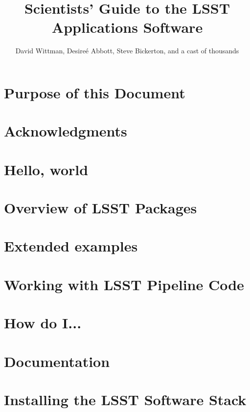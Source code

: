 \documentclass[oneside]{book}
\title{Scientists' Guide to the LSST Applications Software}
\author{David Wittman, Desire\'{e} Abbott, Steve Bickerton, and a cast of thousands}
\begin{document}
\maketitle

\chapter*{Purpose of this Document\label{chap-purpose}}


\chapter*{Acknowledgments\label{chap-acknowledgements}}



\chapter{Hello, world\label{chap-hello}}


\chapter{Overview of LSST Packages\label{chap-overview}}



\chapter{Extended examples\label{chap-examples}}


\chapter{Working with LSST Pipeline Code\label{lsst-pipelines}}


\chapter{How do I...\label{chap-howto}}


\chapter{Documentation\label{chap-doc}}


%
% 



\appendix

\chapter{Installing the LSST Software Stack\label{appendix-stackinstall}}

\end{document}
